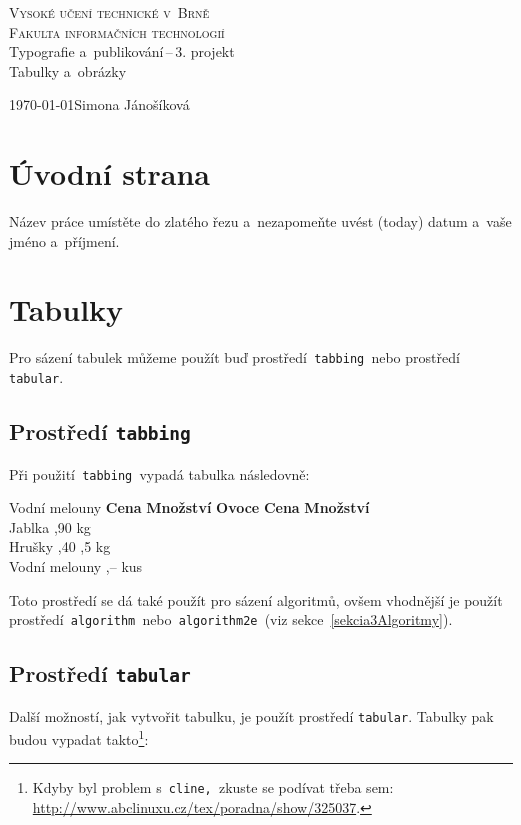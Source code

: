 \documentclass[a4paper, 11pt]{article}
\begin{document}
\begin{titlepage}
    \begin{center}
       \textsc {\Huge{Vysoké učení technické v~Brně}\\
                \huge{Fakulta informačních technologií}\\}
        {\LARGE Typografie a~publikování\,--\,3. projekt\\}
        {\Huge Tabulky a~obrázky}
    \end{center}
    {\Large \today \hfill Simona Jánošíková}
\end{titlepage}

\section{Úvodní strana}
Název práce umístěte do zlatého řezu a~nezapomeňte uvést  (today) datum a~vaše jméno a~příjmení.

\section{Tabulky}
Pro sázení tabulek můžeme použít buď prostředí\verb| tabbing |nebo prostředí\verb| tabular|.

\subsection{Prostředí \texttt{tabbing}}
Při použití\verb| tabbing |vypadá tabulka následovně:

\begin{tabbing}
    Vodní melouny \quad	 \= \textbf{Cena} \quad	 \= \textbf{Množství} \kill
    \textbf{Ovoce}       \> \textbf{Cena}        \> \textbf{Množství}\\
    Jablka               ,90                 kg\\
    Hrušky               ,40                ,5 kg\\
    Vodní melouny        ,--                 kus
\end{tabbing}
Toto prostředí se dá také použít pro sázení algoritmů, ovšem vhodnější je použít prostředí\texttt{ algorithm }nebo\texttt{ algorithm2e }(viz sekce~\ref{sekcia3Algoritmy}).

\subsection{Prostředí \texttt{tabular}}
Další možností, jak vytvořit tabulku, je použít prostředí \verb|tabular|. Tabulky pak budou vypadat takto\footnote{Kdyby byl problem s\texttt{ cline, }zkuste se podívat třeba sem: \href{http://www.abclinuxu.cz/tex/poradna/show/325037}{http://www.abclinuxu.cz/tex/poradna/show/325037}.}:
\end{document}
